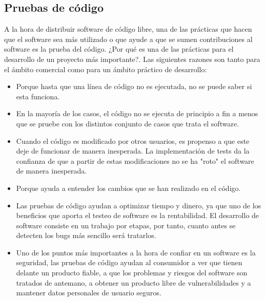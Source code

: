 \subsection*{Pruebas de código}
A la hora de distribuir software de código libre, una de las prácticas que hacen que el software sea más utilizado o que ayude a que se sumen contribuciones al software es la prueba del código. ¿Por qué es una de las prácticas para el desarrollo de un proyecto más importante?. Las siguientes razones son tanto para el ámbito comercial como para un ámbito práctico de desarrollo: 
\begin{itemize}
    \item Porque hasta que una línea de código no es ejecutada, no se puede saber si esta funciona.
    \item En la mayoría de los casos, el código no se ejecuta de principio a fin a menos que se pruebe con los distintos conjunto de casos que trata el software.
    \item Cuando el código es modificado por otros usuarios, es propenso a que este deje de funcionar de manera inesperada. La implementación de tests da la confianza de que a partir de estas modificaciones no se ha "roto" el software de manera inesperada.
    \item Porque ayuda a entender los cambios que se han realizado en el código.
    \item Las pruebas de código ayudan a optimizar tiempo y dinero, ya que uno de los beneficios que aporta el testeo de software es la rentabilidad. El desarrollo de software consiste en un trabajo por etapas, por tanto, cuanto antes se detecten los bugs más sencillo será tratarlos. 
    \item Uno de los puntos más importantes a la hora de confiar en un software es la seguridad, las pruebas de código ayudan al consumidor a ver que tienen delante un producto fiable, a que los problemas y riesgos del software son tratados de antemano, a obtener un producto libre de vulnerabilidades y a mantener datos personales de usuario seguros.
\end{itemize}

